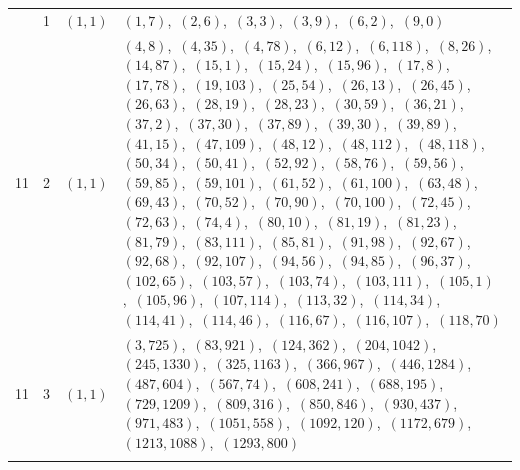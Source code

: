 \documentclass[11pt]{article}
\begin{document}
\begin{longtable}{@{}rrl>{\raggedright\arraybackslash}p{}@{}}
\addlinespace[3pt]
11 & 1 & $(1,1)$ & $(1,7)$,\allowbreak\ $(2,6)$,\allowbreak\ $(3,3)$,\allowbreak\ $(3,9)$,\allowbreak\ $(6,2)$,\allowbreak\ $(9,0)$\\
11 & 2 & $(1,1)$ & $(4,8)$,\allowbreak\ $(4,35)$,\allowbreak\ $(4,78)$,\allowbreak\ $(6,12)$,\allowbreak\ $(6,118)$,\allowbreak\ $(8,26)$,\allowbreak\ $(14,87)$,\allowbreak\ $(15,1)$,\allowbreak\ $(15,24)$,\allowbreak\ $(15,96)$,\allowbreak\ $(17,8)$,\allowbreak\ $(17,78)$,\allowbreak\ $(19,103)$,\allowbreak\ $(25,54)$,\allowbreak\ $(26,13)$,\allowbreak\ $(26,45)$,\allowbreak\ $(26,63)$,\allowbreak\ $(28,19)$,\allowbreak\ $(28,23)$,\allowbreak\ $(30,59)$,\allowbreak\ $(36,21)$,\allowbreak\ $(37,2)$,\allowbreak\ $(37,30)$,\allowbreak\ $(37,89)$,\allowbreak\ $(39,30)$,\allowbreak\ $(39,89)$,\allowbreak\ $(41,15)$,\allowbreak\ $(47,109)$,\allowbreak\ $(48,12)$,\allowbreak\ $(48,112)$,\allowbreak\ $(48,118)$,\allowbreak\ $(50,34)$,\allowbreak\ $(50,41)$,\allowbreak\ $(52,92)$,\allowbreak\ $(58,76)$,\allowbreak\ $(59,56)$,\allowbreak\ $(59,85)$,\allowbreak\ $(59,101)$,\allowbreak\ $(61,52)$,\allowbreak\ $(61,100)$,\allowbreak\ $(63,48)$,\allowbreak\ $(69,43)$,\allowbreak\ $(70,52)$,\allowbreak\ $(70,90)$,\allowbreak\ $(70,100)$,\allowbreak\ $(72,45)$,\allowbreak\ $(72,63)$,\allowbreak\ $(74,4)$,\allowbreak\ $(80,10)$,\allowbreak\ $(81,19)$,\allowbreak\ $(81,23)$,\allowbreak\ $(81,79)$,\allowbreak\ $(83,111)$,\allowbreak\ $(85,81)$,\allowbreak\ $(91,98)$,\allowbreak\ $(92,67)$,\allowbreak\ $(92,68)$,\allowbreak\ $(92,107)$,\allowbreak\ $(94,56)$,\allowbreak\ $(94,85)$,\allowbreak\ $(96,37)$,\allowbreak\ $(102,65)$,\allowbreak\ $(103,57)$,\allowbreak\ $(103,74)$,\allowbreak\ $(103,111)$,\allowbreak\ $(105,1)$,\allowbreak\ $(105,96)$,\allowbreak\ $(107,114)$,\allowbreak\ $(113,32)$,\allowbreak\ $(114,34)$,\allowbreak\ $(114,41)$,\allowbreak\ $(114,46)$,\allowbreak\ $(116,67)$,\allowbreak\ $(116,107)$,\allowbreak\ $(118,70)$\\
11 & 3 & $(1,1)$ & $(3,725)$,\allowbreak\ $(83,921)$,\allowbreak\ $(124,362)$,\allowbreak\ $(204,1042)$,\allowbreak\ $(245,1330)$,\allowbreak\ $(325,1163)$,\allowbreak\ $(366,967)$,\allowbreak\ $(446,1284)$,\allowbreak\ $(487,604)$,\allowbreak\ $(567,74)$,\allowbreak\ $(608,241)$,\allowbreak\ $(688,195)$,\allowbreak\ $(729,1209)$,\allowbreak\ $(809,316)$,\allowbreak\ $(850,846)$,\allowbreak\ $(930,437)$,\allowbreak\ $(971,483)$,\allowbreak\ $(1051,558)$,\allowbreak\ $(1092,120)$,\allowbreak\ $(1172,679)$,\allowbreak\ $(1213,1088)$,\allowbreak\ $(1293,800)$\\
\addlinespace[3pt]

\end{longtable}
\end{document}
